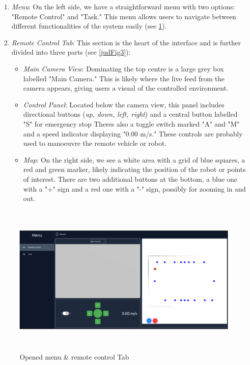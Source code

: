 \documentclass[../../main]{subfiles}
\begin{document}
    \begin{enumerate}
    \def\labelenumi{\arabic{enumi}.}
    \item
      \emph{Menu}: On the left side, we have a straightforward menu with two
      options: "Remote Control" and "Task." This menu allows users to
      navigate between different functionalities of the system easily (see
      \cref{judFig2}).
    \item
      \emph{Remote Control Tab}: This section is the heart of the interface
      and is further divided into three parts (see \cref{judFig3}):
    
      \begin{itemize}
      \item
        \emph{Main Camera View}: Dominating the top centre is a large grey
        box labelled "Main Camera." This is likely where the live feed from
        the camera appears, giving users a visual of the controlled
        environment.
      \item
        \emph{Control Panel}: Located below the camera view, this panel
        includes directional buttons (\emph{up, down, left, right}) and a
        central button labelled "S" for emergency stop
        There\textquotesingle s also a toggle switch marked "A" and "M" and
        a speed indicator displaying "0.00 m/s." These controls are probably
        used to manoeuvre the remote vehicle or robot.
      \item
        \emph{Map}: On the right side, we see a white area with a grid of
        blue squares, a red and green marker, likely indicating the position
        of the robot or points of interest. There are two additional buttons
        at the bottom, a blue one with a "+" sign and a red one with a "-"
        sign, possibly for zooming in and out.
      \end{itemize}
    \end{enumerate}
    
    \begin{figure}
    \centering
    \includegraphics[width=6.26806in,height=2.95417in]{img/image003.png}
    \caption{Opened menu \& remote control Tab}
    \label{judFig2}
    \end{figure}
    
\end{document}
